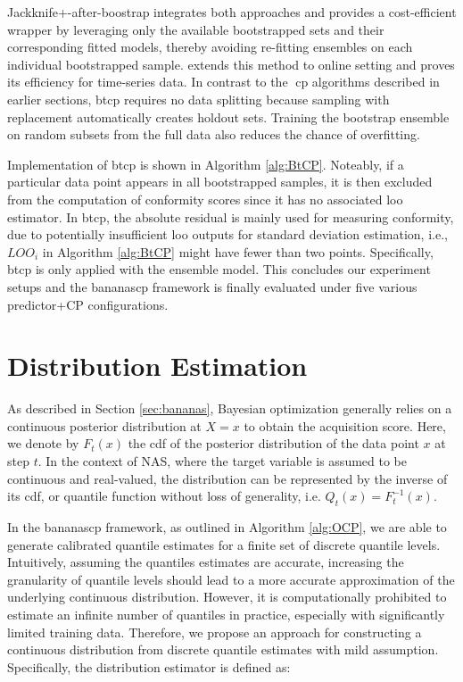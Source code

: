 Jackknife+-after-boostrap \cite{kim2020predictive} integrates both approaches and provides a cost-efficient wrapper by leveraging only the available bootstrapped sets and their corresponding fitted models, thereby avoiding re-fitting ensembles on each individual bootstrapped sample. \cite{pmlr-v139-xu21h} extends this method to online setting and proves its efficiency for time-series data. In contrast to the \gls{cp} algorithms described in earlier sections, \gls{btcp} requires no data splitting because sampling with replacement automatically creates holdout sets. Training the bootstrap ensemble on random subsets from the full data also reduces the chance of overfitting.

Implementation of \gls{btcp} is shown in Algorithm \ref{alg:BtCP}. Noteably, if a particular  data point appears in all bootstrapped samples, it is then excluded from the computation of conformity scores since it has no associated \gls{loo} estimator. In \gls{btcp}, the absolute residual is mainly used for measuring conformity, due to potentially insufficient \gls{loo} outputs for standard deviation estimation, i.e., $LOO_i$ in Algorithm \ref{alg:BtCP} might have fewer than two points. Specifically, \gls{btcp} is only applied with the ensemble model. This concludes our experiment setups and the \gls{bananascp} framework is finally evaluated under five various predictor+CP configurations.


\section{Distribution Estimation}
\label{sec:distest}
As described in Section \ref{sec:bananas}, Bayesian optimization generally relies on a continuous posterior distribution at $X=x$ to obtain the acquisition score. Here, we denote by $F_t(x)$ the \gls{cdf} of the posterior distribution of the data point $x$ at step $t$. In the context of NAS, where the target variable is assumed to be continuous and real-valued, the distribution can be represented by the inverse of its \gls{cdf}, or quantile function without loss of generality, i.e. $Q_{t}(x) = F^{-1}_{t}(x)$. 

In the \gls{bananascp} framework, as outlined in Algorithm \ref{alg:OCP}, we are able to generate calibrated quantile estimates for a finite set of discrete quantile levels. Intuitively, assuming the quantiles estimates are accurate, increasing the granularity of quantile levels should lead to a more accurate approximation of the underlying continuous distribution. However, it is computationally prohibited to estimate an infinite number of quantiles in practice, especially with significantly limited training data. Therefore, we propose an approach for constructing a continuous distribution from discrete quantile estimates with mild assumption. Specifically, the distribution estimator is defined as:

